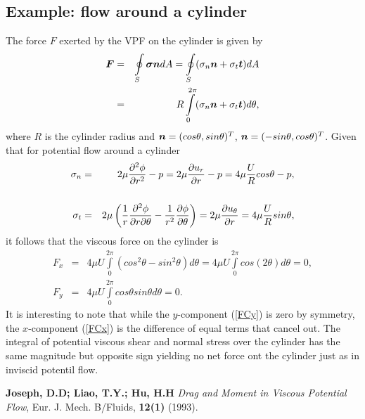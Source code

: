 \subsection{Example: flow around a cylinder}
The force $F$ exerted by the VPF on the cylinder is given by
\begin{eqnarray*}
 \mbox{\boldmath{${F}$}} &=& \oint \limits_S \mbox{\boldmath{$\mathsf{\sigma}$}} \mbox{\boldmath{${n}$}} dA = \oint \limits_S (\sigma_n \mbox{\boldmath{${n}$}} + \sigma_t \mbox{\boldmath{${t}$}}) dA\\
 &=& R \int \limits_0^{2 \pi} (\sigma_n \mbox{\boldmath{${n}$}} + \sigma_t \mbox{\boldmath{${t}$}}) d\theta,
\end{eqnarray*}
where $R$ is the cylinder radius and $\mbox{\boldmath{${n}$}}=(cos \theta , sin \theta)^T$, $\mbox{\boldmath{${n}$}}=(-sin \theta , cos \theta)^T$. 
Given that for potential flow around a cylinder
\begin{eqnarray}
 \sigma_n &=& 2 \mu \frac{\partial^2 \phi}{\partial r^2} - p = 2 \mu \displaystyle\frac{\partial{u_r}}{\partial{r}} - p = 4 \mu \frac{U}{R} cos \theta - p , \\
 \nonumber \\
 \sigma_t &=& 2 \mu \left( \frac{1}{r} \frac{\partial^2 \phi}{\partial r \partial \theta} - \frac{1}{r^2} \displaystyle\frac{\partial{\phi}}{\partial{\theta}} \right)  = 2 \mu \displaystyle\frac{\partial{u_{\theta}}}{\partial{r}} = 4 \mu \frac{U}{R} sin \theta,
\end{eqnarray}
it follows that the viscous force on the cylinder is
\begin{eqnarray}
 F_x &=& 4 \mu U \int \limits_0^{2 \pi} (cos^2 \theta - sin^2 \theta) d\theta = 4 \mu U \int \limits_0^{2 \pi} cos( 2 \theta ) d\theta = 0, \label{FCx} \\
 F_y &=& 4 \mu U \int \limits_0^{2 \pi} cos \theta sin \theta d\theta = 0. \label{FCy}
\end{eqnarray}
It is interesting to note that while the $y$-component (\ref{FCy}) is zero by symmetry, the $x$-component (\ref{FCx}) is the difference of equal terms that cancel out. 
The integral of potential viscous shear and normal stress over the cylinder has the same magnitude but opposite sign yielding no net force ont the cylinder just as in inviscid potentil flow. 


\begin{thebibliography}{1}
\textbf{Joseph, D.D; Liao, T.Y.; Hu, H.H} \textsl{Drag and Moment in Viscous Potential Flow}, Eur. J. Mech. B/Fluids, \textbf{12(1)} (1993).
\end{thebibliography}

